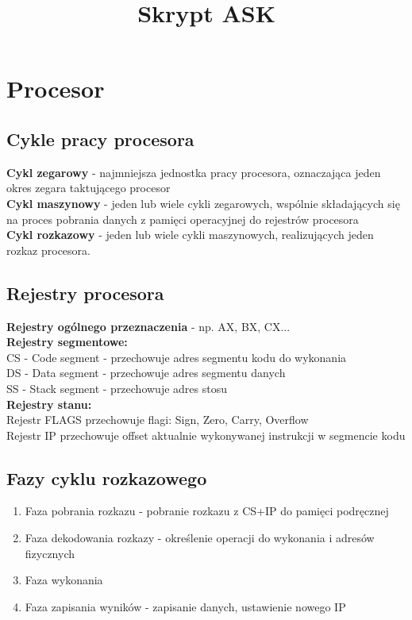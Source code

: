 \documentclass[a4paper]{article}
\author{}
\title{Skrypt ASK}
\date{}
\begin{document}
\maketitle
\section{Procesor}
\subsection{Cykle pracy procesora}
\textbf{Cykl zegarowy} - najmniejsza jednostka pracy procesora, oznaczająca jeden okres zegara taktującego procesor\\
\textbf{Cykl maszynowy} - jeden lub wiele cykli zegarowych, wspólnie składających się na proces pobrania danych z pamięci operacyjnej do rejestrów procesora\\
\textbf{Cykl rozkazowy} - jeden lub wiele cykli maszynowych, realizujących jeden rozkaz procesora.

\subsection{Rejestry procesora}
\textbf{Rejestry ogólnego przeznaczenia} - np. AX, BX, CX...\\
\textbf{Rejestry segmentowe:}\\
CS - Code segment - przechowuje adres segmentu kodu do wykonania\\
DS - Data segment - przechowuje adres segmentu danych\\
SS - Stack segment - przechowuje adres stosu\\
\textbf{Rejestry stanu:}\\
Rejestr FLAGS przechowuje flagi: Sign, Zero, Carry, Overflow\\
Rejestr IP przechowuje offset aktualnie wykonywanej instrukcji w segmencie kodu\\

\subsection{Fazy cyklu rozkazowego}
\begin{enumerate}
\item Faza pobrania rozkazu - pobranie rozkazu z CS+IP do pamięci podręcznej
\item Faza dekodowania rozkazy - określenie operacji do wykonania i adresów fizycznych
\item Faza wykonania
\item Faza zapisania wyników - zapisanie danych, ustawienie nowego IP
\end{enumerate}
\newpage
\end{document}
